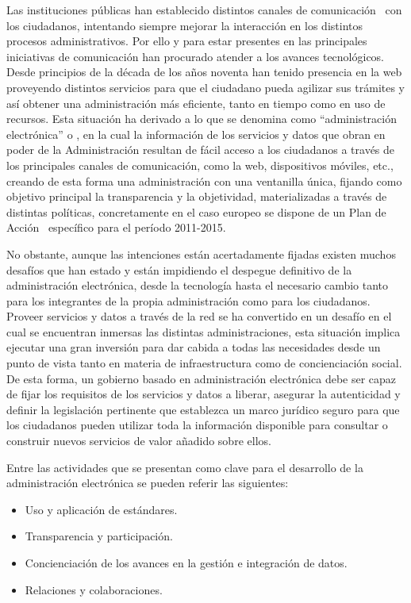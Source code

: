 Las instituciones públicas han establecido distintos canales de comunicación~\cite{improvingW3c}
con los ciudadanos, intentando siempre mejorar la interacción en los distintos
procesos administrativos. Por ello y para estar presentes en las principales iniciativas
de comunicación han procurado atender a los avances tecnológicos. Desde
principios de la década de los años noventa han tenido presencia en la web proveyendo
distintos servicios para que el ciudadano pueda agilizar sus trámites
y así obtener una administración más eficiente, tanto en tiempo como en uso
de recursos. Esta situación ha derivado a lo que se denomina como ``administración
electrónica'' o \egov, en la cual la información de los servicios
y datos que obran en poder de la Administración resultan de fácil acceso a los
 ciudadanos a través de los principales canales de comunicación, 
como la web, dispositivos móviles, etc., creando de esta forma
una administración con una ventanilla única, fijando como objetivo principal
 la transparencia y la objetividad, materializadas a través de distintas
políticas, concretamente en el caso europeo se dispone de un Plan de Acción~\cite{policy-eu} específico para el período 2011-2015.

No obstante, aunque las intenciones están acertadamente fijadas existen muchos
desafíos que han estado y están impidiendo el despegue definitivo de la administración
electrónica, desde la tecnología hasta el necesario cambio tanto para los
integrantes de la propia administración como para los ciudadanos. Proveer
servicios y datos a través de la red se ha convertido en un desafío en el cual 
se encuentran inmersas las distintas administraciones, esta situación
implica ejecutar una gran inversión para dar cabida a todas las necesidades desde un punto
de vista tanto en materia de infraestructura como de concienciación social. De esta forma,
un gobierno basado en administración electrónica debe ser capaz de fijar los requisitos
de los servicios y datos a liberar, asegurar la autenticidad y definir la legislación
pertinente que establezca un marco jurídico seguro para que los ciudadanos pueden utilizar
toda la información disponible para consultar o construir nuevos servicios de valor
añadido sobre ellos.

Entre las actividades que se presentan como clave para el desarrollo de la administración
electrónica se pueden referir las siguientes:
\begin{itemize}
 \item Uso y aplicación de estándares.
 \item Transparencia y participación.
 \item Concienciación de los avances en la gestión e integración de datos.
 \item Relaciones y colaboraciones.
\end{itemize}

